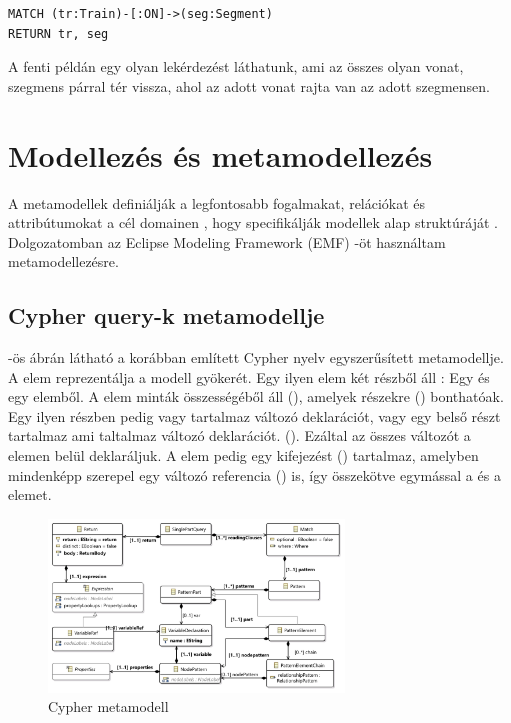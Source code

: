 \begin{lstlisting}[style=viatrasmall]
MATCH (tr:Train)-[:ON]->(seg:Segment)
RETURN tr, seg	
\end{lstlisting}   

A fenti példán egy olyan lekérdezést láthatunk,  ami az összes
olyan vonat, szegmens párral tér vissza, ahol az adott vonat rajta van az adott szegmensen.  


\section{Modellezés és metamodellezés}
A metamodellek definiálják a legfontosabb fogalmakat, relációkat és attribútumokat a cél domainen , hogy 
specifikálják modellek alap struktúráját \cite{semerath2017formal}. Dolgozatomban az Eclipse Modeling Framework
 (EMF) \cite{EMF} -öt használtam metamodellezésre.



\subsection{Cypher query-k metamodellje}
 -ös ábrán látható a korábban említett Cypher nyelv egyszerűsített metamodellje.
A  elem reprezentálja a modell gyökerét. Egy ilyen elem két részből áll : Egy  
és egy  elemből. A  elem minták összességéből áll (), amelyek 
részekre () bonthatóak. Egy ilyen részben pedig vagy tartalmaz változó deklarációt,
vagy egy belső részt tartalmaz ami taltalmaz változó deklarációt. ().
Ezáltal az összes változót a  elemen belül deklaráljuk. A  elem  pedig egy
kifejezést () tartalmaz, amelyben mindenképp szerepel egy változó referencia
 () is, így összekötve egymással a  és a  elemet. 

\begin{figure}
	\centering
	\includegraphics[width=0.7\textwidth]{figures/openCypherClassDiagram}
	\caption{Cypher metamodell}
	\label{fig:cyphermetamodell}
\end{figure}


